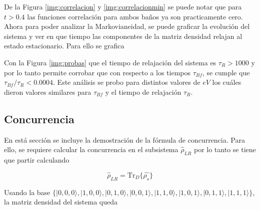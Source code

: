 \begin{appendixs}

De la Figura \ref{img:correlacion} y \ref{img:correlacionmin} se puede notar que para $t>0.4$ las funciones correlación para ambos baños ya son practicamente cero. Ahora para poder analizar la Markovianeidad, se puede graficar la evolución del sistema y ver en que tiempo las componentes de la matriz densidad relajan al estado estacionario. Para ello se grafica 



Con la Figura \ref{img:probas} que el tiempo de relajación del sistema es $\tau_{R}>1000$ y por lo tanto permite corrobar que con respecto a los tiempos $\tau_{Bf}$, se cumple que $\tau_{Bf}/\tau_{R} < 0.0004 $. Este análisis se probo para distintos valores de $eV$ los cuáles dieron valores similares para $\tau_{Bf}$ y el tiempo de relajación $\tau_{R}$. 

\label{appendix5tauf}

\newpage 

\subsection{Concurrencia}
En está sección se incluye la demostración de la fórmula de concurrencia. Para ello, se requiere calcular la concurrencia en el subsistema $\hat{\rho}_{LR}$ por lo tanto se tiene que partir calculando 

\begin{equation*}
    \hat{\rho}_{LR} = \text{Tr}_{D}\{ \hat{\rho_{s}} \}
\end{equation*}

Usando la base $\{|0,0,0\rangle, |1,0,0\rangle, |0,1,0\rangle, |0,0,1\rangle, |1,1,0\rangle, |1,0,1\rangle, |0,1,1\rangle, |1,1,1\rangle\}$, la matriz densidad del sistema queda


\end{appendixs}
